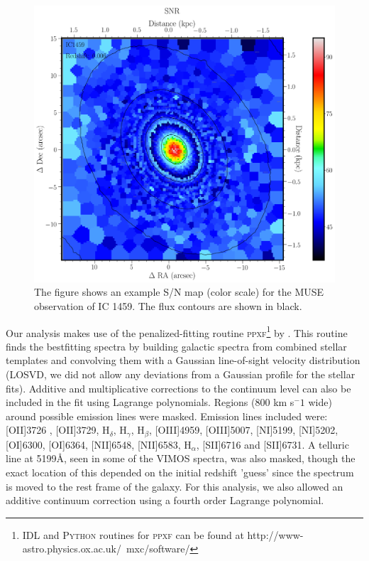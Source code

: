 	\begin{figure}
		\centering
		\includegraphics[width=.6\textwidth]{chapter2/egSNR.png}
		\caption[Example S/N map]{The figure shows an example S/N map (color scale) for the MUSE observation of IC 1459. The flux contours are shown in black.}
		\label{fig:MassRe}
	\end{figure}


	Our analysis makes use of the penalized-fitting routine \textsc{ppxf}\footnote{\textsc{IDL} and \textsc{Python} routines for \textsc{ppxf} can be found at http://www-astro.physics.ox.ac.uk/~mxc/software/} by \citet{Cappellari2004, Cappellari2016a}. This routine finds the bestfitting spectra by building galactic spectra from combined stellar templates and convolving them with a Gaussian line-of-sight velocity distribution (LOSVD, we did not allow any deviations from a Gaussian profile for the stellar fits). Additive and multiplicative corrections to the continuum level can also be included in the fit using Lagrange polynomials. Regions (800 km s$^-1$ wide) around possible emission lines were masked. Emission lines included were: [OII]3726 , [OII]3729, H$_\delta$, H$_\gamma$, H$_\beta$, [OIII]4959, [OIII]5007, [NI]5199, [NI]5202, [OI]6300, [OI]6364, [NII]6548, [NII]6583, H$_\alpha$, [SII]6716 and [SII]6731. A telluric line at 5199\AA, seen in some of the VIMOS spectra, was also masked, though the exact location of this depended on the initial redshift 'guess' since the spectrum is moved to the rest frame of the galaxy. For this analysis, we also allowed an additive continuum correction using a fourth order Lagrange polynomial.

